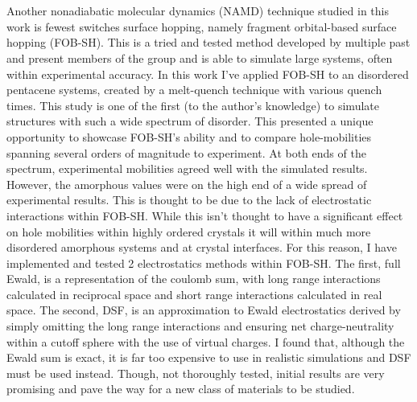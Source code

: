 \\\\
Another nonadiabatic molecular dynamics (NAMD) technique studied in this work is fewest switches surface hopping, namely fragment orbital-based surface hopping (FOB-SH). This is a tried and tested method developed by multiple past and present members of the group and is able to simulate large systems, often within experimental accuracy. In this work I've applied FOB-SH to an disordered pentacene systems, created by a melt-quench technique with various quench times. This study is one of the first (to the author's knowledge) to simulate structures with such a wide spectrum of disorder. This presented a unique opportunity to showcase FOB-SH's ability and to compare hole-mobilities spanning several orders of magnitude to experiment. At both ends of the spectrum, experimental mobilities agreed well with the simulated results. However, the amorphous values were on the high end of a wide spread of experimental results. This is thought to be due to the lack of electrostatic interactions within FOB-SH. While this isn't thought to have a significant effect on hole mobilities within highly ordered crystals it will within much more disordered amorphous systems and at crystal interfaces. For this reason, I have implemented and tested 2 electrostatics methods within FOB-SH. The first, full Ewald, is a representation of the coulomb sum, with long range interactions calculated in reciprocal space and short range interactions calculated in real space. The second, DSF, is an approximation to Ewald electrostatics derived by simply omitting the long range interactions and ensuring net charge-neutrality within a cutoff sphere with the use of virtual charges. I found that, although the Ewald sum is exact, it is far too expensive to use in realistic simulations and DSF must be used instead. Though, not thoroughly tested, initial results are very promising and pave the way for a new class of materials to be studied.
